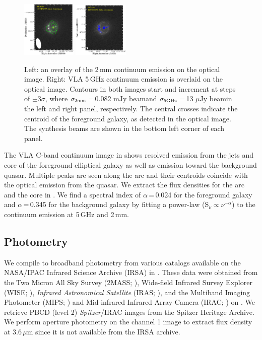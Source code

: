 \documentclass[]{emulateapj}
\begin{document}
\begin{figure}[!htbp]
\centering
\includegraphics[width=0.23\textwidth]{../Figures/F555W_ContPdBI.eps}
\hspace{-0.5em}
\includegraphics[width=0.235\textwidth]{../Figures/F555W_ContVLA.eps}
\caption{Left: an overlay of the 2\,mm continuum emission on the optical image.
Right: VLA 5\,GHz continuum emission is overlaid on the optical image.
Contours in both images start and increment at steps of
$\pm$3$\sigma$, where $\sigma_{\rm 2mm}$\,=\,0.082 mJy beam\pmOne and
$\sigma_{\rm 5GHz}$\,=\,13 $\mu$Jy beam\pmOne in the left and right panel, respectively.
The central crosses indicate the centroid of the foreground galaxy,
as detected in the optical image. The synthesis beams are shown in the bottom left corner of each panel.
\label{fig:cont}}\vspace{0.51em}
\end{figure}

The VLA C-band continuum image in  shows resolved emission from the
jets and core of the foreground elliptical galaxy
as well as emission toward the background quasar.
Multiple peaks are seen along the arc and their centroids
coincide with the optical emission from the quasar.
We extract the flux densities for the arc and the core in .
We find a spectral index of $\alpha$\,=\,0.024 for the foreground
galaxy and $\alpha$\,=\,0.345 for the background galaxy by fitting a
power-law (S$_\nu \propto \nu^{-\alpha}$) to the continuum emission at
5\,GHz and 2\,mm.

\subsection{Photometry} \label{sec:photometry} %
We compile \mir to \fir broadband photometry from various
catalogs available on the NASA/IPAC Infrared Science
Archive (IRSA) in . These data were obtained from
the Two Micron All Sky Survey (2MASS; \citealt{Skrutskie06a}),
Wide-field Infrared Survey Explorer (WISE; \citealt{Wright10a}),
{\it Infrared Astronomical Satellite} (IRAS; \citealt{Neugebauer84a}), and
the Multiband Imaging Photometer (MIPS; \citealt{Rieke04a}) and
Mid-infrared Infrared Array Camera (IRAC; \citealt{Fazio04a}) on
\spitzer. We retrieve PBCD (level 2) {\it Spitzer}/IRAC images from the
Spitzer Heritage Archive. We perform aperture photometry on
the channel 1 image to extract flux density at 3.6\,$\mu$m
since it is not available from the IRSA archive.
\end{document}
